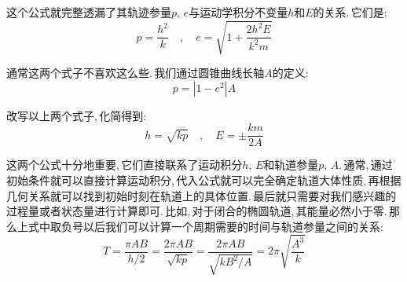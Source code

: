 这个公式就完整透漏了其轨迹参量$p,\,e$与运动学积分不变量$h$和$E$的关系.\,它们是:
\[p=\frac{h^2}{k}\quad ,\quad e=\sqrt{1+\frac{2h^2E}{k^2m}}\]

通常这两个式子不喜欢这么些.\,我们通过圆锥曲线长轴$A$的定义:
\[p=|1-e^2|A\]

改写以上两个式子,\,化简得到:
\[h=\sqrt{kp}\quad ,\quad E=\pm \frac{km}{2A}\]

这两个公式十分地重要,\,它们直接联系了运动积分$h,\,E$和轨道参量$p,\,A$.\,通常,\,通过初始条件就可以直接计算运动积分,\,代入公式就可以完全确定轨道大体性质,\,再根据几何关系就可以找到初始时刻在轨道上的具体位置.\,最后就只需要对我们感兴趣的过程量或者状态量进行计算即可.\,比如,\,对于闭合的椭圆轨道,\,其能量必然小于零.\,那么上式中取负号以后我们可以计算一个周期需要的时间与轨道参量之间的关系:
\[T=\frac{\pi AB}{h/2}=\frac{2\pi AB}{\sqrt{kp}}=\frac{2\pi AB}{\sqrt{kB^2/A}}=2\pi\sqrt{\frac{A^3}{k}}\]




